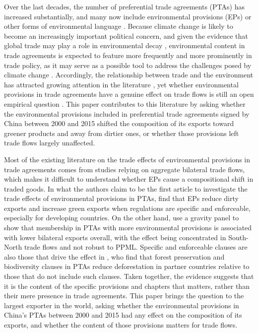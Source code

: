 \documentclass[12pt]{article}
\begin{document}
Over the last decades, the number of preferential trade agreements (PTAs) has increased substantially, and many now include environmental provisions (EPs) or other forms of environmental language \citep{morin2017, mattooHandbookDeepTrade2020}. Because climate change is likely to become an increasingly important political concern, and given the evidence that global trade may play a role in environmental decay \citep{zhangTransboundaryHealthImpacts2017}, environmental content in trade agreements is expected to feature more frequently and more prominently in trade policy, as it may serve as a possible tool to address the challenges posed by climate change \citep{frankel2009}. Accordingly, the relationship between trade and the environment has attracted growing attention in the literature \citep{copeland2022}, yet whether environmental provisions in trade agreements have a genuine effect on trade flows is still an open empirical question \citep{gutsch2025, felbermayr2025}. This paper contributes to this literature by asking whether the environmental provisions included in preferential trade agreements signed by China between 2000 and 2015 shifted the composition of its exports toward greener products and away from dirtier ones, or whether those provisions left trade flows largely unaffected.

Most of the existing literature on the trade effects of environmental provisions in trade agreements comes from studies relying on aggregate bilateral trade flows, which makes it difficult to understand whether EPs cause a compositional shift in traded goods. In what the authors claim to be the first article to investigate the trade effects of environmental provisions in PTAs, \citet{brandi2020} find that EPs reduce dirty exports and increase green exports when regulations are specific and enforceable, especially for developing countries. On the other hand, \citet{berger2020} use a gravity panel to show that membership in PTAs with more environmental provisions is associated with lower bilateral exports overall, with the effect being concentrated in South-North trade flows and not robust to PPML. Specific and enforceable clauses are also those that drive the effect in \cite{abman2024}, who find that forest preservation and biodiversity clauses in PTAs reduce deforestation in partner countries relative to those that do not include such clauses. Taken together, the evidence suggests that it is the content of the specific provisions and chapters that matters, rather than their mere presence in trade agreements. This paper brings the question to the largest exporter in the world, asking whether the environmental provisions in China's PTAs between 2000 and 2015 had any effect on the composition of its exports, and whether the content of those provisions matters for trade flows.
\end{document}

